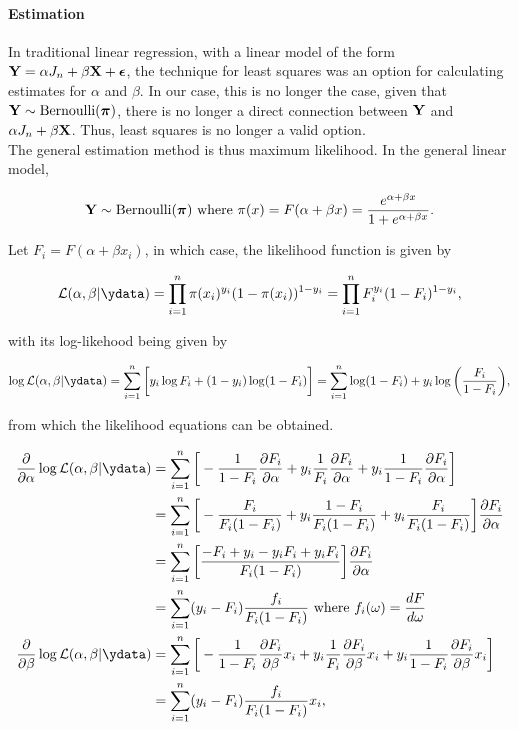 \documentclass{homework}
\begin{document}
\paragraph{\textbf{Estimation}}

In traditional linear regression, with a linear model of the form ${\bf Y} = \alpha J_n + \beta {\bf X} + \bm{\epsilon}$, the technique for least squares was an option for calculating estimates for $\alpha$ and $\beta$. In our case, this is no longer the case, given that ${\bf Y}  \sim \textnormal{Bernoulli} (\bm{\pi})$, there is no longer a direct connection between ${\bf Y}$ and $\alpha J_n + \beta {\bf X}$. Thus, least squares is no longer a valid option. \\

The general estimation method is thus maximum likelihood. In the general linear model, 

$$
{\bf Y} \sim \textnormal{Bernoulli} (\bm{\pi}) \textnormal{ where } \pi(x) = F(\alpha + \beta x) = \frac{e^{\alpha + \beta x}}{1+e^{\alpha + \beta x}}.
$$

Let $F_i =  F(\alpha + \beta x_i)$, in which case, the likelihood function is given by 

\begin{equation}
    \mathcal{L}(\alpha, \beta | \ydata) = \prod_{i=1}^{n} \pi(x_i)^{y_i} (1-\pi(x_i))^{1-y_i} = \prod_{i=1}^{n} F_i^{y_i} (1-F_i)^{1-y_i},
\end{equation}

with its log-likehood being given by 

\begin{equation}
\log \mathcal{L}(\alpha, \beta | \ydata) =  \sum_{i=1}^{n} \bigg[ {y_i} \log F_i + {(1-y_i)} \log (1-F_i) \bigg] = \sum_{i=1}^{n} \log(1-F_i) + y_i \log\bigg(\frac{F_i}{1-F_i}\bigg),
\end{equation}

from which the likelihood equations can be obtained. 

\begin{align}
    \frac{\partial}{\partial \alpha} \log \mathcal{L}(\alpha, \beta | \ydata) &=  \sum_{i=1}^{n} \bigg[ -\frac{1}{1-F_i}  \frac{\partial F_i}{\partial \alpha} + y_i \frac{1}{F_i} \frac{\partial F_i}{\partial \alpha} + y_i \frac{1}{1-F_i} \frac{\partial F_i}{\partial \alpha} \bigg]\\
    &= \sum_{i=1}^{n} \bigg[ -\frac{F_i}{F_i(1-F_i)}  + y_i \frac{1-F_i}{F_i(1-F_i)} + y_i \frac{F_i}{F_i(1-F_i)} \bigg] \frac{\partial F_i}{\partial \alpha} \\
    &= \summation \bigg[ \frac{-F_i + y_i - y_i F_i + y_i F_i}{F_i (1-F_i)} \bigg] \frac{\partial F_i}{\partial \alpha} \\
    &= \summation (y_i - F_i) \frac{f_i}{F_i (1-F_i)} \textnormal{ where } f_i (\omega) = \frac{dF}{d\omega}
    \\
    \frac{\partial}{\partial \beta} \log \mathcal{L}(\alpha, \beta | \ydata) &=  \sum_{i=1}^{n} \bigg[ -\frac{1}{1-F_i}  \frac{\partial F_i}{\partial \beta} x_i + y_i \frac{1}{F_i} \frac{\partial F_i}{\partial \beta} x_i + y_i \frac{1}{1-F_i} \frac{\partial F_i}{\partial \beta} x_i \bigg]\\
    &= \summation (y_i - F_i) \frac{f_i}{F_i (1-F_i)} x_i,
\end{align}
\end{document}
